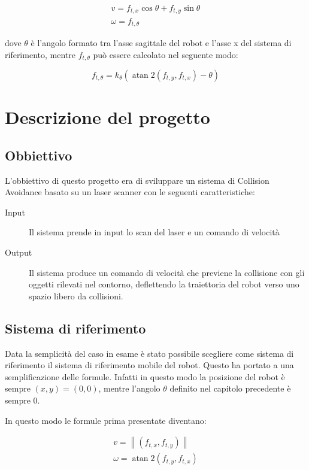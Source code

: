 \documentclass[Lau, binding=0.6cm, oneside]{sapthesis}
\begin{document}
$$
\begin{array}{l}
v=f_{t, x} \cos \theta+f_{t, y} \sin \theta \\
\omega=f_{t, \theta}
\end{array}
$$

dove $\theta$ è l'angolo formato tra l'asse sagittale del robot e l'asse x del sistema di riferimento, mentre $f_{t, \theta}$ può essere calcolato nel seguente modo:

$$
f_{t, \theta}=k_{\theta}\left(\operatorname{atan} 2\left(f_{t, y}, f_{t, x}\right)-\theta\right)
$$

\cite{fonte2}

\chapter{Descrizione del progetto}
\section{Obbiettivo}
L'obbiettivo di questo progetto era di sviluppare un sistema di Collision Avoidance basato su un laser scanner con le seguenti caratteristiche:
\begin{description}
	\item[Input] Il sistema prende in input lo scan del laser e un comando di velocità
	\item[Output] Il sistema produce un comando di velocità che previene la collisione con gli oggetti rilevati nel contorno, deflettendo la traiettoria del robot verso uno spazio libero da collisioni.
\end{description}

\section{Sistema di riferimento}
Data la semplicità del caso in esame è stato possibile scegliere come sistema di riferimento il sistema di riferimento mobile del robot.
Questo ha portato a una semplificazione delle formule.
Infatti in questo modo la posizione del robot è sempre $\left(x, y\right)=(0,0)$, mentre l'angolo $\theta$ definito nel capitolo precedente è sempre 0.

In questo modo le formule prima presentate diventano:

$$
\begin{array}{l}
v=\left\|\left(f_{t, x}, f_{t, y}\right)\right\| \\
\omega=\operatorname{atan} 2\left(f_{t, y}, f_{t, x}\right)
\end{array}
$$
\end{document}
